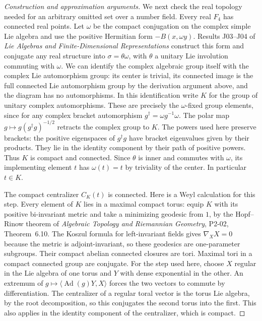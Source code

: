 \documentclass[11pt,a4paper,openany,oneside]{book}
\theoremstyle{resultstyle}
\theoremstyle{definition}
\numberwithin{equation}{chapter}
\begin{document}
\begin{proof}[Construction and approximation arguments]
We next check the real topology needed for an
arbitrary omitted set over a number field.
Every real \(F_4\) has connected real points.
Let \(\omega\) be the compact conjugation on the
complex simple Lie algebra and use the positive
Hermitian form \(-B(x,\omega y)\).
Results J03--J04 of \emph{Lie Algebras and
Finite-Dimensional Representations} construct
this form and conjugate any real structure into
\(\sigma=\theta\omega\), with \(\theta\)
a unitary Lie involution commuting with
\(\omega\). We can identify the complex algebraic
group itself with the complex Lie automorphism
group: its center is trivial, its connected image
is the full connected Lie automorphism group by
the derivation argument above, and the diagram
has no automorphisms. In this identification
write \(K\) for the group of unitary complex
automorphisms. These are precisely the
\(\omega\)-fixed group elements, since for any
complex bracket automorphism
\(g^\dagger=\omega g^{-1}\omega\).
The polar map
\(g\mapsto g(g^\dagger g)^{-1/2}\)
retracts the complex group to \(K\).
The powers used here preserve brackets: the
positive eigenspaces of \(g^\dagger g\) have
bracket eigenvalues given by their products.
They lie in the identity component by their
path of positive powers. Thus \(K\) is compact
and connected. Since \(\theta\) is inner
and commutes with \(\omega\), its implementing
element \(t\) has \(\omega(t)=t\) by triviality
of the center. In particular \(t\in K\).

The compact centralizer \(C_K(t)\) is connected.
Here is a Weyl calculation for this step.
Every element of \(K\) lies in a maximal
compact torus: equip \(K\) with its positive
bi-invariant metric and take a minimizing
geodesic from \(1\), by the Hopf--Rinow
theorem of \emph{Algebraic Topology and
Riemannian Geometry}, P2-02, Theorem~6.10.
The Koszul formula for left-invariant fields
gives \(\nabla_X X=0\) because the metric is
adjoint-invariant, so these geodesics are
one-parameter subgroups. Their compact
abelian connected closures are tori.
Maximal tori in a compact connected group
are conjugate. For the step used here,
choose \(X\) regular in the Lie algebra of
one torus and \(Y\) with dense exponential
in the other. An extremum of
\(g\mapsto \langle\operatorname{Ad}(g)Y,X\rangle\)
forces the two vectors to commute by
differentiation. The centralizer of a
regular toral vector is the torus Lie
algebra, by the root decomposition, so this
conjugates the second torus into the first.
This also applies in the identity component
of the centralizer, which is compact.


\end{proof}
\end{document}
